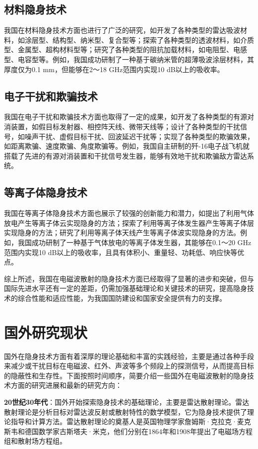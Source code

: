 \documentclass{article}
\begin{document}
\subsection{材料隐身技术}
我国在材料隐身技术方面也进行了广泛的研究，如开发了各种类型的雷达吸波材料，如涂层型、结构型、纳米型、复合型等；探索了各种类型的透波材料，如介质型、金属型、超构材料型等；研究了各种类型的阻抗加载材料，如电阻型、电感型、电容型等。例如，我国成功研制了一种基于碳纳米管的超薄吸波涂层材料，其厚度仅为0.1 mm，但能够在2～18 GHz范围内实现10 dB以上的吸收率。

\subsection{电子干扰和欺骗技术}我国在电子干扰和欺骗技术方面也取得了一定的成果，如开发了各种类型的有源对消装置，如假目标发射器、相控阵天线、微带天线等；设计了各种类型的干扰信号，如噪声干扰、虚假目标干扰、回波延迟干扰等；实现了各种类型的欺骗效果，如距离欺骗、速度欺骗、角度欺骗等。例如，我国自主研制的歼-16电子战飞机就搭载了先进的有源对消装置和干扰信号发生器，能够有效地干扰和欺骗敌方雷达系统。

\subsection{等离子体隐身技术}
我国在等离子体隐身技术方面也展示了较强的创新能力和潜力，如提出了利用气体放电产生等离子体云实现隐身的方法；探索了利用等离子体发生器产生等离子体层实现隐身的方法；研究了利用等离子体天线产生等离子体波实现隐身的方法。例如，我国成功研制了一种基于气体放电的等离子体发生器，其能够在0.1～20 GHz范围内实现10 dB以上的吸收率，且具有体积小、重量轻、功耗低、响应快等优点。


综上所述，我国在电磁波散射的隐身技术方面已经取得了显著的进步和突破，但与国际先进水平还有一定的差距，仍需加强基础理论和关键技术的研究，提高隐身技术的综合性能和适应性能，为我国国防建设和国家安全提供有力的支撑。
\section{国外研究现状}

国外在隐身技术方面有着深厚的理论基础和丰富的实践经验，主要是通过各种手段来减少或干扰目标在电磁波、红外、声波等多个频段上的探测信号，从而提高目标的隐蔽性和生存性。下面按照时间顺序，简要介绍一些国外在电磁波散射的隐身技术方面的研究进展和最新的研究方向：

\textbf{20世纪30年代}：国外开始探索隐身技术的基础理论，主要是雷达散射理论。雷达散射理论是分析目标对雷达波反射或散射特性的数学模型，它为隐身技术提供了理论指导和计算方法。雷达散射理论的奠基人是英国物理学家詹姆斯·克拉克·麦克斯韦和德国数学家古斯塔夫·米克，他们分别在1864年和1908年提出了电磁场方程组和散射场方程组。
\end{document}
